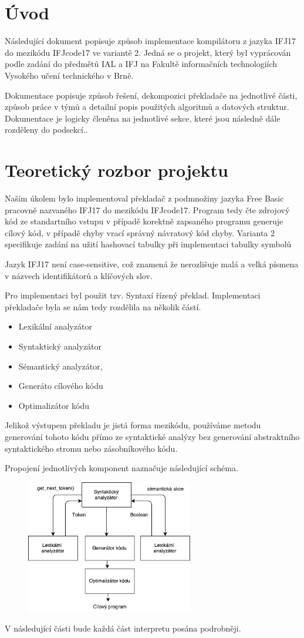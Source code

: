\section{Úvod}
Následující dokument popisuje způsob implementace kompilátoru z jazyka IFJ17 do mezikódu
IFJcode17 ve variantě 2. Jedná se o projekt,
který byl vyprácován podle zadání do předmětů IAL a IFJ na Fakultě
informačních technologiích Vysokého učení technického v Brně.

Dokumentace popisuje způsob řešení, dekompozici překladače na jednotlivé části,
způsob práce v týmů a detailní popis použitých algoritmů a datových struktur. Dokumentace je logicky členěna na
jednotlivé sekce, které jsou následně dále rozděleny do podsekcí..

\section{Teoretický rozbor projektu}
Naším úkolem bylo implementoval překladač z podmnožiny jazyka Free Basic pracovně nazvaného
IFJ17 do mezikódu IFJcode17. Program tedy čte zdrojový kód ze standartního vstupu v případě korektně zapsaného
programu generuje cílový kód, v případě chyby vrací správný návratový kód chyby.
Varianta 2 specifikuje zadání na užití hashovací tabulky při implementaci tabulky symbolů

Jazyk IFJ17 není case-sensitive, což znamená že nerozlišuje malá a velká
písmena v názvech identifikátorů a klíčových slov.

Pro implementaci byl použit tzv. Syntaxí řízený překlad.
Implementaci překladače byla se nám tedy rozdělila na několik částí.

\begin{itemize}
    \item Lexikální analyzátor
    \item Syntaktický analyzátor
    \item Sémantický analyzátor,
    \item Generáto cílového kódu
    \item Optimalizátor kódu
\end{itemize}

Jelikož výstupem překladu je jistá forma mezikódu, používáme metodu generování tohoto kódu přímo ze syntaktické
analýzy bez generování abstraktního syntaktického stromu nebo zásobníkového kódu.

Propojení jednotlivých komponent naznačuje následující schéma.
\vspace*{16px}
\begin{figure}[htbp]
\centering
\includegraphics[width=0.65\textwidth, angle=0]{src/assets/structure.pdf}
\end{figure}

V následující části bude každá část interpretu posána podrobněji.